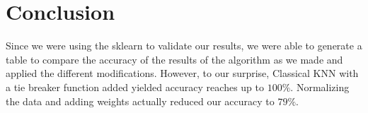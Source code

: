 \documentclass{article}
\begin{document}
\section{Conclusion}
Since we were using the sklearn to validate our results, we were able to generate a table to compare the accuracy of the results of the algorithm as we made and applied the different modifications. However, to our surprise, Classical KNN with a tie breaker function added yielded accuracy reaches up to $100\%$. Normalizing the data and adding weights actually reduced our accuracy to $79\%$. 
\end{document}
